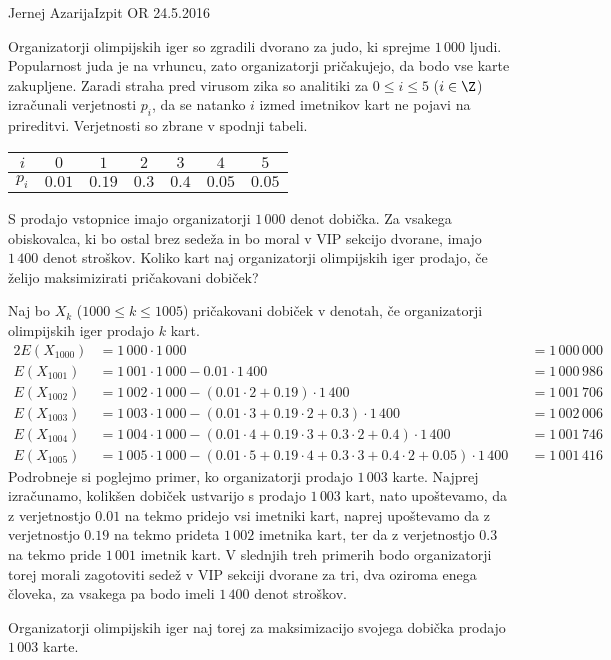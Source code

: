 \begin{naloga}{Jernej Azarija}{Izpit OR 24.5.2016}
\begin{vprasanje}
Organizatorji olimpijskih iger so zgradili dvorano za judo,
ki sprejme $1\,000$ ljudi.
Popularnost juda je na vrhuncu,
zato organizatorji pričakujejo, da bodo vse karte zakupljene.
Zaradi straha pred virusom zika so analitiki
za $0 \le i \le 5$ ($i \in \Z$) izračunali verjetnosti $p_i$,
da se natanko $i$ izmed imetnikov kart ne pojavi na prireditvi.
Verjetnosti so zbrane v spodnji tabeli.
\begin{center}
\begin{tabular}{c|cccccc}
$i$   & $0$    & $1$    & $2$   & $3$   & $4$    & $5$ \\ \hline
$p_i$ & $0.01$ & $0.19$ & $0.3$ & $0.4$ & $0.05$ & $0.05$
\end{tabular}
\end{center}

S prodajo vstopnice imajo organizatorji $1\,000$ denot dobička.
Za vsakega obiskovalca,
ki bo ostal brez sedeža in bo moral v VIP sekcijo dvorane,
imajo $1\,400$ denot stroškov.
Koliko kart naj organizatorji olimpijskih iger prodajo,
če želijo maksimizirati pričakovani dobiček?
\end{vprasanje}

\begin{odgovor}
Naj bo $X_k$ ($1000 \le k \le 1005$) pričakovani dobiček v denotah,
če organizatorji olimpijskih iger prodajo $k$ kart.
\begin{alignat*}{2}
E(X_{1000}) &= 1\,000 \cdot 1\,000 &&= 1\,000\,000 \\
E(X_{1001}) &= 1\,001 \cdot 1\,000 - 0.01 \cdot 1\,400 &&= 1\,000\,986 \\
E(X_{1002}) &= 1\,002 \cdot 1\,000 - (0.01 \cdot 2 + 0.19) \cdot 1\,400
&&= 1\,001\,706 \\
E(X_{1003}) &= 1\,003 \cdot 1\,000 -
(0.01 \cdot 3 + 0.19 \cdot 2 + 0.3) \cdot 1\,400 &&= 1\,002\,006 \\
E(X_{1004}) &= 1\,004 \cdot 1\,000 -
(0.01 \cdot 4 + 0.19 \cdot 3 + 0.3 \cdot 2 + 0.4) \cdot 1\,400
&&= 1\,001\,746 \\
E(X_{1005}) &= 1\,005 \cdot 1\,000 -
(0.01 \cdot 5 + 0.19 \cdot 4 + 0.3 \cdot 3 + 0.4 \cdot 2 + 0.05) \cdot 1\,400
&&= 1\,001\,416
\end{alignat*}
Podrobneje si poglejmo primer, ko organizatorji prodajo $1\,003$ karte.
Najprej izračunamo, kolikšen dobiček ustvarijo s prodajo $1\,003$ kart,
nato upoštevamo,
da z ve\-rjet\-nost\-jo $0.01$ na tekmo pridejo vsi imetniki kart,
naprej upoštevamo da z ve\-rjet\-nost\-jo $0.19$
na tekmo prideta $1\,002$ imetnika kart,
ter da z ve\-rjet\-nost\-jo $0.3$ na tekmo pride $1\,001$ imetnik kart.
V slednjih treh primerih bodo organizatorji
torej morali zagotoviti sedež v VIP sekciji dvorane
za tri, dva oziroma enega človeka,
za vsakega pa bodo imeli $1\,400$ denot stroškov.

Organizatorji olimpijskih iger naj torej
za maksimizacijo svojega dobička prodajo $1\,003$ karte.
\end{odgovor}

\end{naloga}
